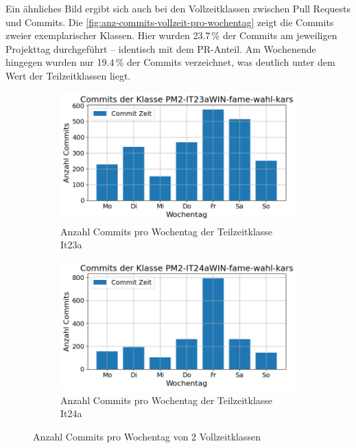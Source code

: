Ein ähnliches Bild ergibt sich auch bei den Vollzeitklassen zwischen Pull Requests und Commits. Die \autoref{fig:anz-commits-vollzeit-pro-wochentag} zeigt die Commits zweier exemplarischer Klassen. Hier wurden 23.7\,\% der Commits am jeweiligen Projekttag durchgeführt – identisch mit dem PR-Anteil. Am Wochenende hingegen wurden nur 19.4\,\% der Commits verzeichnet, was deutlich unter dem Wert der Teilzeitklassen liegt.

\begin{figure}[htbp]
    \centering
    \begin{subfigure}[b]{0.48\textwidth}
        \centering
        \includegraphics[width=\textwidth]{Figures/commits-klasse-per-wochentag-23a.png}
         \caption{Anzahl Commits pro Wochentag der Teilzeitklasse It23a}
        \label{fig:anzahl-commits-pro-wochentag-it23a}
    \end{subfigure}
    \hfill
    \begin{subfigure}[b]{0.48\textwidth}
        \centering
        \includegraphics[width=\textwidth]{Figures/commits-klasse-per-wochentag-24a.png}
         \caption{Anzahl Commits pro Wochentag der Teilzeitklasse It24a}
        \label{fig:anzahl-commits-pro-wochentag-it24a}
    \end{subfigure}
    \caption{Anzahl Commits pro Wochentag von 2 Vollzeitklassen}
    \label{fig:anz-commits-vollzeit-pro-wochentag}
\end{figure}


